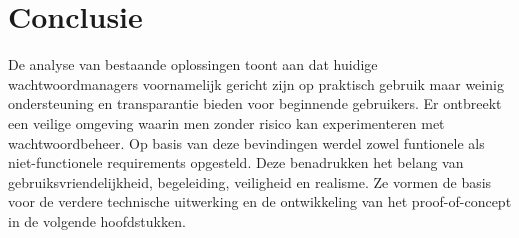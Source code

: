 \section{Conclusie}
De analyse van bestaande oplossingen toont aan dat huidige wachtwoordmanagers voornamelijk gericht zijn op praktisch gebruik maar weinig ondersteuning en transparantie bieden voor beginnende gebruikers. Er ontbreekt een veilige omgeving waarin men zonder risico kan experimenteren met wachtwoordbeheer.
Op basis van deze bevindingen werdel zowel funtionele als niet-functionele requirements opgesteld. Deze benadrukken het belang van gebruiksvriendelijkheid, begeleiding, veiligheid en realisme.
Ze vormen de basis voor de verdere technische uitwerking en de ontwikkeling van het proof-of-concept in de volgende hoofdstukken.